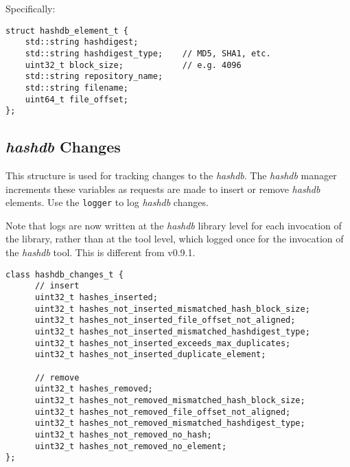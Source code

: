 \documentclass[12pt,twoside]{article}
\newcommand{\hdb}{\emph{hashdb}\xspace}
\begin{document}
Specifically:
\begin{small}
\begin{verbatim}
struct hashdb_element_t {
    std::string hashdigest;
    std::string hashdigest_type;    // MD5, SHA1, etc.
    uint32_t block_size;            // e.g. 4096
    std::string repository_name;
    std::string filename;
    uint64_t file_offset;
};
\end{verbatim}
\end{small}

\subsection{\hdb Changes}
This structure is used for tracking changes to the \hdb.
The \hdb manager increments these variables
as requests are made to insert or remove \hdb elements.
Use the \texttt{logger} to log \hdb changes.

Note that logs are now written at the \hdb library level
for each invocation of the library,
rather than at the tool level, which logged once
for the invocation of the \hdb tool.
This is different from v0.9.1.

\begin{small}
\begin{verbatim}
class hashdb_changes_t {
      // insert
      uint32_t hashes_inserted;
      uint32_t hashes_not_inserted_mismatched_hash_block_size;
      uint32_t hashes_not_inserted_file_offset_not_aligned;
      uint32_t hashes_not_inserted_mismatched_hashdigest_type;
      uint32_t hashes_not_inserted_exceeds_max_duplicates;
      uint32_t hashes_not_inserted_duplicate_element;

      // remove
      uint32_t hashes_removed;
      uint32_t hashes_not_removed_mismatched_hash_block_size;
      uint32_t hashes_not_removed_file_offset_not_aligned;
      uint32_t hashes_not_removed_mismatched_hashdigest_type;
      uint32_t hashes_not_removed_no_hash;
      uint32_t hashes_not_removed_no_element;
};
\end{verbatim}
\end{small}

\end{document}
